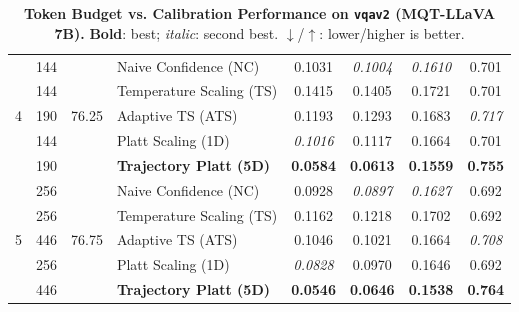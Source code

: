 \begin{table}[t]
\begin{tabular}{ccclcccc}
\multirow{5}{*}{4} & 144 & \multirow{5}{*}{76.25} & Naive Confidence (NC) & 0.1031 & \textit{0.1004} & \textit{0.1610} & 0.701 \\
 & 144 &  & Temperature Scaling (TS) & 0.1415 & 0.1405 & 0.1721 & 0.701 \\
 & 190 &  & Adaptive TS (ATS) & 0.1193 & 0.1293 & 0.1683 & \textit{0.717} \\
 & 144 &  & Platt Scaling (1D) & \textit{0.1016} & 0.1117 & 0.1664 & 0.701 \\
 & 190 &  & \textbf{Trajectory Platt (5D)} & \textbf{0.0584} & \textbf{0.0613} & \textbf{0.1559} & \textbf{0.755} \\
\midrule
\multirow{5}{*}{5} & 256 & \multirow{5}{*}{76.75} & Naive Confidence (NC) & 0.0928 & \textit{0.0897} & \textit{0.1627} & 0.692 \\
 & 256 &  & Temperature Scaling (TS) & 0.1162 & 0.1218 & 0.1702 & 0.692 \\
 & 446 &  & Adaptive TS (ATS) & 0.1046 & 0.1021 & 0.1664 & \textit{0.708} \\
 & 256 &  & Platt Scaling (1D) & \textit{0.0828} & 0.0970 & 0.1646 & 0.692 \\
 & 446 &  & \textbf{Trajectory Platt (5D)} & \textbf{0.0546} & \textbf{0.0646} & \textbf{0.1538} & \textbf{0.764} \\
\bottomrule
\end{tabular}
\caption{\textbf{Token Budget vs. Calibration Performance on \texttt{vqav2} (MQT-LLaVA 7B).} \textbf{Bold}: best; \textit{italic}: second best. $\downarrow$/$\uparrow$: lower/higher is better.}
\label{tab:token_budget_vqav2_mqt}
\end{table}
